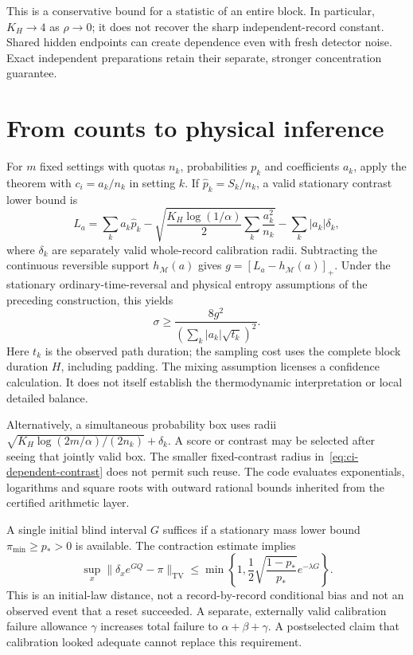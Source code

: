 This is a conservative bound for a statistic of an entire block. In particular,
$K_H\to4$ as $\rho\to0$; it does not recover the sharp independent-record
constant. Shared hidden endpoints can create dependence even with fresh
detector noise. Exact independent preparations retain their separate,
stronger concentration guarantee.

\section{From counts to physical inference}
For $m$ fixed settings with quotas $n_k$, probabilities $p_k$ and coefficients
$a_k$, apply the theorem with $c_i=a_k/n_k$ in setting $k$. If
$\widehat p_k=S_k/n_k$, a valid stationary contrast lower bound is
\begin{equation}
 L_a=\sum_k a_k\widehat p_k-
 \sqrt{\frac{K_H\log(1/\alpha)}2\sum_k\frac{a_k^2}{n_k}}
 -\sum_k|a_k|\delta_k,
 \label{eq:ci-dependent-contrast}
\end{equation}
where $\delta_k$ are separately valid whole-record calibration radii.
Subtracting the continuous reversible support $h_{\mathcal M}(a)$ gives
$g=[L_a-h_{\mathcal M}(a)]_+$. Under the stationary ordinary-time-reversal
and physical entropy assumptions of the preceding construction, this yields
\begin{equation}
 \sigma\geq\frac{8g^2}{(\sum_k|a_k|\sqrt{t_k})^2}.
 \label{eq:ci-dependent-entropy}
\end{equation}
Here $t_k$ is the observed path duration; the sampling cost uses the complete
block duration $H$, including padding. The mixing assumption licenses a
confidence calculation. It does not itself establish the thermodynamic
interpretation or local detailed balance.

Alternatively, a simultaneous probability box uses radii
$\sqrt{K_H\log(2m/\alpha)/(2n_k)}+\delta_k$. A score or contrast may be
selected after seeing that jointly valid box. The smaller fixed-contrast
radius in~\eqref{eq:ci-dependent-contrast} does not permit such reuse.
The code evaluates exponentials, logarithms and square roots with outward
rational bounds inherited from the certified arithmetic layer.

A single initial blind interval $G$ suffices if a stationary mass lower bound
$\pi_{\min}\geq p_*>0$ is available. The contraction estimate implies
\begin{equation}
 \sup_x\|\delta_xe^{GQ}-\pi\|_{\mathrm{TV}}
 \leq\min\left\{1,\frac12\sqrt{\frac{1-p_*}{p_*}}e^{-\lambda G}\right\}.
 \label{eq:ci-one-burn}
\end{equation}
This is an initial-law distance, not a record-by-record conditional bias and
not an observed event that a reset succeeded. A separate, externally valid
calibration failure allowance $\gamma$ increases total failure to
$\alpha+\beta+\gamma$. A postselected claim that calibration looked adequate
cannot replace this requirement.

